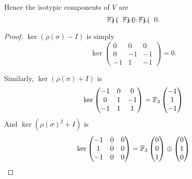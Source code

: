 \documentclass{unswmaths}
\begin{document}
\begin{corollary}
    Hence the isotypic components of $V$ are
    \begin{equation*}
        {\mathbb{F}_3}\begin{pmatrix}
        
        \end{pmatrix},\;\;{\mathbb{F}_3}\begin{pmatrix}  \end{pmatrix}\oplus{\mathbb{F}_3}\begin{pmatrix} \end{pmatrix},\;\;0.
    \end{equation*}
\end{corollary}
\begin{proof}
    $\ker (\rho(\sigma)-I)$ is simply
    \begin{equation*}
        \ker\begin{pmatrix}
            0 & 0 & 0\\
            0 & -1 & -1\\
            -1 & 1 & -1
        \end{pmatrix} = 0.
    \end{equation*}
    
    Similarly, $\ker(\rho(\sigma)+I)$ is
    \begin{equation*}
        \ker\begin{pmatrix}
            -1 & 0 & 0\\
            0 & 1 & -1\\
            -1 & 1 & 1
        \end{pmatrix} = {\mathbb{F}_3}\begin{pmatrix}
                -1 \\1 \\-1
        \end{pmatrix}
    \end{equation*}
    And $\ker(\rho(\sigma)^2+I)$ is
    \begin{equation*}
        \ker\begin{pmatrix}
            -1 & 0 & 0\\
            1 & 0 & 0\\
            -1 & 0 & 0
        \end{pmatrix}
        = {\mathbb{F}_3}\begin{pmatrix}
            0\\0\\1
        \end{pmatrix}\oplus
        \begin{pmatrix}
            0\\1\\0
        \end{pmatrix}       
    \end{equation*}
\end{proof}
\end{document}

